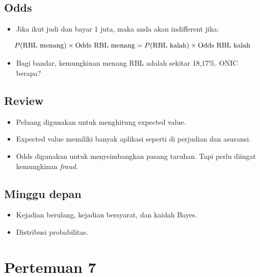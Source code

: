 \documentclass[
  letterpaper,
  DIV=11,
  numbers=noendperiod]{scrartcl}
\providecommand{\tightlist}{%
  \setlength{\itemsep}{0pt}\setlength{\parskip}{0pt}}\usepackage{longtable,booktabs,array}
\begin{document}
\hypertarget{odds-3}{%
\subsection{Odds}\label{odds-3}}

\begin{itemize}
\tightlist
\item
  Jika ikut judi dan bayar 1 juta, maka anda akan indifferent jika:
\end{itemize}

\[
P(\text{RBL menang}) \times \text{Odds RBL menang} = \\ P(\text{RBL kalah}) \times \text{Odds RBL kalah}
\]

\begin{itemize}
\tightlist
\item
  Bagi bandar, kemungkinan menang RBL adalah sekitar 18,17\%. ONIC
  berapa?
\end{itemize}

\hypertarget{review-1}{%
\subsection{Review}\label{review-1}}

\begin{itemize}
\item
  Peluang digunakan untuk menghitung expected value.
\item
  Expected value memiliki banyak aplikasi seperti di perjudian dan
  asuransi.
\item
  Odds digunakan untuk menyeimbangkan pasang taruhan. Tapi perlu diingat
  kemungkinan \emph{fraud}.
\end{itemize}

\hypertarget{minggu-depan}{%
\subsection{Minggu depan}\label{minggu-depan}}

\begin{itemize}
\item
  Kejadian berulang, kejadian bersyarat, dan kaidah Bayes.
\item
  Distribusi probabilitas.
\end{itemize}

\hypertarget{pertemuan-7}{%
\section{Pertemuan 7}\label{pertemuan-7}}
\end{document}
